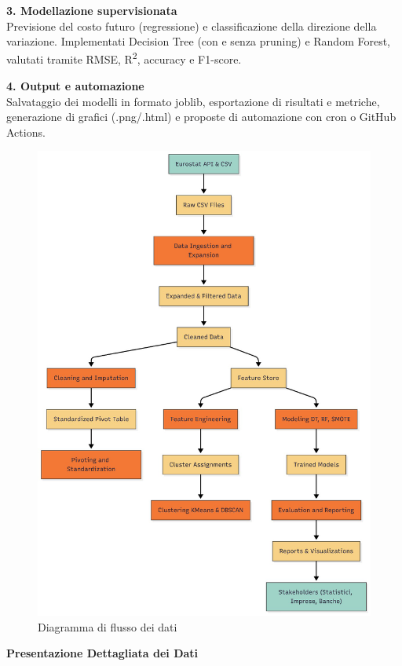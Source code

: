 \documentclass[conference]{IEEEtran}
\begin{document}
\vspace{1em}

{\large \textbf{3. Modellazione supervisionata}}\\
{\small Previsione del costo futuro (regressione) e classificazione della direzione della variazione. Implementati Decision Tree (con e senza pruning) e Random Forest, valutati tramite RMSE, R\textsuperscript{2}, accuracy e F1-score.}

\vspace{1em}

{\large \textbf{4. Output e automazione}}\\
{\small Salvataggio dei modelli in formato joblib, esportazione di risultati e metriche, generazione di grafici (.png/.html) e proposte di automazione con cron o GitHub Actions.}

\begin{figure}[h]
  \centering
  \includegraphics[width=0.8\linewidth]{images/Data_Flow_Diagram}
  \caption{Diagramma di flusso dei dati}
  \label{fig:dataflow}
\end{figure}

\vspace{1em}
{\Large\bfseries Presentazione Dettagliata dei Dati}
\vspace{0.5em}
     
\end{document}
